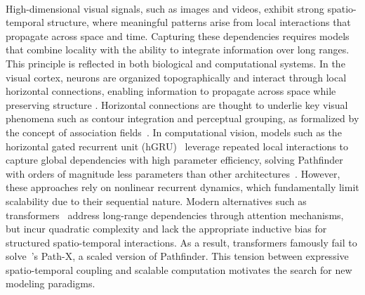 \documentclass{article}
\begin{document}
\paragraph{} High-dimensional visual signals, such as images and videos, exhibit strong spatio-temporal structure, where meaningful patterns arise from local interactions that propagate across space and time. Capturing these dependencies requires models that combine locality with the ability to integrate information over long ranges.
%
This principle is reflected in both biological and computational systems. In the visual cortex, neurons are organized topographically and interact through local horizontal connections, enabling information to propagate across space while preserving structure \citep{gilbert1989,bosking1997,stettler2002}. Horizontal connections are thought to underlie key visual phenomena such as contour integration and perceptual grouping, as formalized by the concept of association fields~\citep{field1993,gilbertli2013}.
%
In computational vision, models such as the horizontal gated recurrent unit (hGRU)~\citep{linsley2018} leverage repeated local interactions to capture global dependencies with high parameter efficiency, solving Pathfinder with orders of magnitude less parameters than other architectures~\citep{linsley2018,kim2019}.
%
However, these approaches rely on nonlinear recurrent dynamics, which fundamentally limit scalability due to their sequential nature. Modern alternatives such as transformers~\citep{vaswani2017} address long-range dependencies through attention mechanisms, but incur quadratic complexity and lack the appropriate inductive bias for structured spatio-temporal interactions. As a result, transformers famously fail to solve~\citet{tay2021}'s Path-X, a scaled version of Pathfinder.
%
This tension between expressive spatio-temporal coupling and scalable computation motivates the search for new modeling paradigms.
\end{document}

